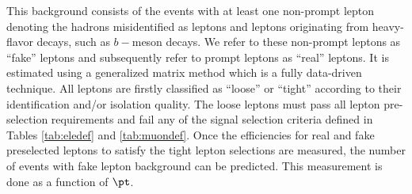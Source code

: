 
This background consists of the events with at least one non-prompt lepton denoting the hadrons misidentified as leptons and leptons originating from heavy-flavor decays, such as $b-$meson decays. We refer to these non-prompt leptons as ``fake'' leptons and subsequently refer to prompt leptons as ``real'' leptons. It is estimated using a generalized matrix method \cite{Arguin:1558979,Gillam:2014xua} which is a fully data-driven technique. All leptons are firstly classified as ``loose'' or ``tight'' according to their identification and/or isolation quality. The loose leptons must pass all lepton pre-selection requirements and fail any of the signal selection criteria defined in Tables \ref{tab:eledef} and \ref{tab:muondef}. Once the efficiencies for real and fake preselected leptons to satisfy the tight lepton selections are measured, the number of events with fake lepton background can be predicted. This measurement is done as a function of $\pt$. %


